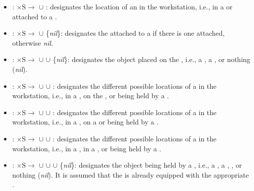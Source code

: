 \begin{itemize}
\item {}: $\mathrm{\times S\rightarrow}$ $\cup$ : designates the location of an  in the workstation, i.e., in a  or attached to a .

\item {}: $\mathrm{\times S\rightarrow}$ $\cup$ \{\textit{nil}\}: designates the  attached to a  if there is one attached, otherwise \textit{nil}.

\item {}: $\mathrm{\times S\rightarrow}$ $\cup$  $\cup$ \{\textit{nil}\}: designates the object placed on the , i.e., a , a , or nothing (\textit{nil}).

\item {}: $\mathrm{\times S\rightarrow}$ $\cup$  $\cup$ : designates the different possible locations of a  in the workstation, i.e., in a , on the , or being held by a .

\item {}: $\mathrm{\times S\rightarrow}$ $\cup$  $\cup$ : designates the different possible locations of a  in the workstation, i.e., in a , on a  or being held by a .

\item {}: $\mathrm{\times S\rightarrow}$ $\cup$  $\cup$ : designates the different possible locations of a  in the workstation, i.e., in a , in a , or being held by a .

\item {}: $\mathrm{\times S\rightarrow}$ $\cup$  $\cup$  $\cup$ \{\textit{nil}\}: designates the object being held by a , i.e., a , a , , or nothing (\textit{nil}). It is assumed that the  is already equipped with the appropriate .


\end{itemize}
